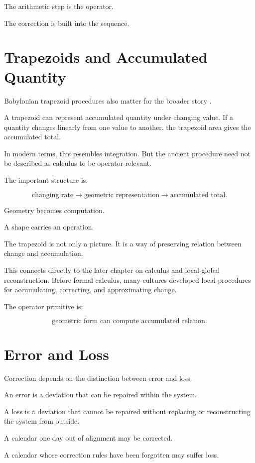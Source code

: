 \documentclass[11pt]{book}
\begin{document}
The arithmetic step is the operator.

The correction is built into the sequence.

\section{Trapezoids and Accumulated Quantity}

Babylonian trapezoid procedures also matter for the broader story \cite{Ossendrijver2016AncientBabylonianAstronomers}.

A trapezoid can represent accumulated quantity under changing value. If a quantity changes linearly from one value to another, the trapezoid area gives the accumulated total.

In modern terms, this resembles integration. But the ancient procedure need not be described as calculus to be operator-relevant.

The important structure is:

\[
\text{changing rate}
\rightarrow
\text{geometric representation}
\rightarrow
\text{accumulated total}.
\]

Geometry becomes computation.

A shape carries an operation.

The trapezoid is not only a picture. It is a way of preserving relation between change and accumulation.

This connects directly to the later chapter on calculus and local-global reconstruction. Before formal calculus, many cultures developed local procedures for accumulating, correcting, and approximating change.

The operator primitive is:

\[
\text{geometric form can compute accumulated relation}.
\]

\section{Error and Loss}

Correction depends on the distinction between error and loss.

An error is a deviation that can be repaired within the system.

A loss is a deviation that cannot be repaired without replacing or reconstructing the system from outside.

A calendar one day out of alignment may be corrected.

A calendar whose correction rules have been forgotten may suffer loss.
\end{document}
